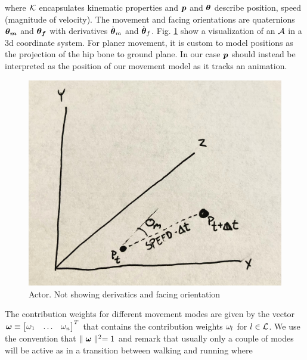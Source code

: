 where $\mathcal{K}$ encapsulates kinematic properties and $\boldsymbol{p }$ and $\boldsymbol{\theta }$ describe position, speed (magnitude of velocity). The movement and facing orientations are quaternions $\boldsymbol{\theta_m }$ and ${\boldsymbol{\theta_f }}$ with derivatives $\dot{\boldsymbol{\theta }}_m$ and $\dot{\boldsymbol{\theta }}_f$. Fig. \ref{fig:actor} show a visualization of an $\mathcal{A}$ in a 3d coordinate system. For planer movement, it is custom to model positions as the projection of the hip bone to ground plane. In our case $\boldsymbol{p }$ should instead be interpreted as the position of our movement model as it tracks an animation.  
\begin{figure}
    \centering
    \includegraphics[width=0.75\columnwidth]{img/actor.jpg}
    \caption{Actor. Not showing derivatics and facing orientation}
    \label{fig:actor}
\end{figure}
 The contribution weights for different movement modes are given by the vector $\boldsymbol{\omega } \equiv \begin{bmatrix}\omega_1 & \ldots & \omega_n \end{bmatrix}^T$ that contains the contribution weights $\omega_l$ for $l \in \mathcal{L}$. We use the convention that $\parallel {  \boldsymbol{\omega }  } \parallel^2 = 1$ and remark that usually only a couple of modes will be active as in a transition between walking and running where 
